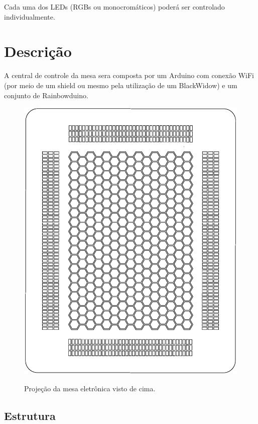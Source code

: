 \documentclass[a4paper,10pt]{article}
\begin{document}
Cada uma dos LEDs (RGBs ou monocromáticos) poderá ser controlado individualmente.

\section{Descrição}

A central de controle da mesa sera composta por um Arduino com conexão WiFi (por meio de um shield ou mesmo pela utilização de um BlackWidow) e um conjunto de Rainbowduino. \\

\begin{center}
\begin{figure}[h!]
	\center
	\includegraphics[angle=0, scale=0.40]{./img/layout-v02.ps}
	\label{figura_layout}
	\caption{Projeção da mesa eletrônica visto de cima.}
\end{figure}
\end{center}

\subsection{Estrutura}
\end{document}
